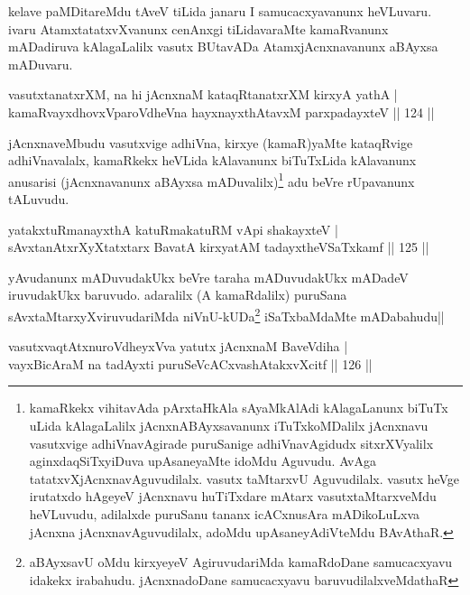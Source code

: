 \begin{artha}
kelave paMDitareMdu tAveV tiLida janaru I samucacxyavanunx heVLuvaru. ivaru AtamxtatatxvXvanunx cenAnxgi tiLidavaraMte kamaRvanunx mADadiruva kAlagaLalilx vasutx BUtavADa AtamxjAcnxnavanunx aBAyxsa mADuvaru.
\end{artha}


\begin{shl}
vasutxtanatxrXM, na hi jAcnxnaM kataqRtanatxrXM kirxyA yathA |\\
kamaRvayxdhovxVparoVdheVna hayxnayxthAtavxM parxpadayxteV \hfill || 124 ||
\end{shl}

\begin{artha}
jAcnxnaveMbudu vasutxvige adhiVna, kirxye (kamaR)yaMte kataqRvige adhiVnavalalx, kamaRkekx heVLida kAlavanunx biTuTxLida kAlavanunx anusarisi (jAcnxnavanunx aBAyxsa mADuvalilx)\footnote[1]{kamaRkekx vihitavAda pArxtaHkAla sAyaMkAlAdi kAlagaLanunx biTuTx uLida kAlagaLalilx jAcnxnABAyxsavanunx iTuTxkoMDalilx jAcnxnavu vasutxvige adhiVnavAgirade puruSanige adhiVnavAgidudx sitxrXVyalilx aginxdaqSiTxyiDuva upAsaneyaMte idoMdu Aguvudu. AvAga tatatxvXjAcnxnavAguvudilalx. vasutx taMtarxvU Aguvudilalx. vasutx heVge irutatxdo hAgeyeV jAcnxnavu huTiTxdare mAtarx vasutxtaMtarxveMdu heVLuvudu, adilalxde puruSanu tananx icACxnusAra mADikoLuLxva jAcnxna jAcnxnavAguvudilalx, adoMdu upAsaneyAdiVteMdu BAvAthaR.} adu beVre rUpavanunx tALuvudu.
\end{artha}


\begin{shl}
yatakxtuRmanayxthA katuRmakatuRM vA\s pi shakayxteV |\\
sAvxtanAtxrXyXtatxtarx BavatA kirxyatAM tadayxtheVSaTxkamf \hfill || 125 ||
\end{shl}

\begin{artha}
yAvudanunx mADuvudakUkx beVre taraha mADuvudakUkx mADadeV iruvudakUkx baruvudo. adaralilx (A kamaRdalilx) puruSana sAvxtaMtarxyXviruvudariMda niVnU-kUDa\footnote[1]{aBAyxsavU oMdu kirxyeyeV AgiruvudariMda kamaRdoDane samucacxyavu idakekx irabahudu. jAcnxnadoDane samucacxyavu baruvudilalxveMdathaR} iSaTxbaMdaMte mADabahudu||
\end{artha}

\begin{shl}
vasutxvaqtAtxnuroVdheyxVva yatutx jAcnxnaM BaveVdiha |\\
vayxBicAraM na tadAyxti puruSeVcACxvashAtakxvXcitf \hfill || 126 ||
\end{shl}	

